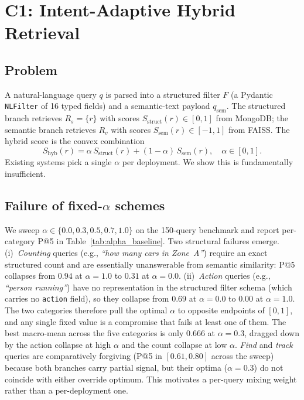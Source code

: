 ﻿\documentclass[conference]{IEEEtran}
\theoremstyle{definition}
\begin{document}
\section{C1: Intent-Adaptive Hybrid Retrieval}\label{sec:adaptive_alpha}

\subsection{Problem}
A natural-language query $q$ is parsed into a structured filter $F$ (a Pydantic \texttt{NLFilter} of 16 typed fields) and a semantic-text payload $q_{\text{sem}}$. The structured branch retrieves $R_s = \{r\}$ with scores $S_{\text{struct}}(r)\in[0,1]$ from MongoDB; the semantic branch retrieves $R_v$ with scores $S_{\text{sem}}(r)\in[-1,1]$ from FAISS. The hybrid score is the convex combination
\begin{equation}
S_{\text{hyb}}(r) = \alpha\, S_{\text{struct}}(r) + (1-\alpha)\, S_{\text{sem}}(r),\quad \alpha\in[0,1].
\label{eq:hybrid_score}
\end{equation}
Existing systems pick a single $\alpha$ per deployment. We show this is fundamentally insufficient.

\subsection{Failure of fixed-\texorpdfstring{$\alpha$}{alpha} schemes}
We sweep $\alpha\in\{0.0, 0.3, 0.5, 0.7, 1.0\}$ on the 150-query benchmark and report per-category P@5 in Table~\ref{tab:alpha_baseline}. Two structural failures emerge. (i)~\emph{Counting} queries (e.g., \textit{``how many cars in Zone~A''}) require an exact structured count and are essentially unanswerable from semantic similarity: P@5 collapses from $0.94$ at $\alpha{=}1.0$ to $0.31$ at $\alpha{=}0.0$. (ii)~\emph{Action} queries (e.g., \textit{``person running''}) have no representation in the structured filter schema (which carries no \texttt{action} field), so they collapse from $0.69$ at $\alpha{=}0.0$ to $0.00$ at $\alpha{=}1.0$. The two categories therefore pull the optimal $\alpha$ to opposite endpoints of $[0,1]$, and any single fixed value is a compromise that fails at least one of them. The best macro-mean across the five categories is only $0.666$ at $\alpha{=}0.3$, dragged down by the action collapse at high $\alpha$ and the count collapse at low $\alpha$. \emph{Find} and \emph{track} queries are comparatively forgiving (P@5 in $[0.61, 0.80]$ across the sweep) because both branches carry partial signal, but their optima ($\alpha{=}0.3$) do not coincide with either override optimum. This motivates a per-query mixing weight rather than a per-deployment one.
\end{document}

